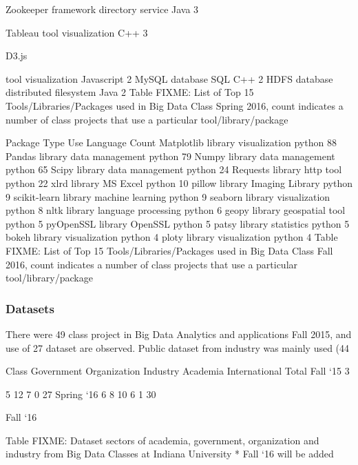 \documentclass[9pt,twocolumn,twoside]{styles/osajnl}
\begin{document}
	Zookeeper
	framework
	directory service
	Java
	3

	Tableau
	tool
	visualization
	C++
	3

	D3.js

	tool
	visualization
	Javascript
	2
	MySQL
	database
	SQL
	C++
	2
	HDFS
	database
	distributed filesystem
	Java
	2
	Table FIXME: List of Top 15 Tools/Libraries/Packages used in Big Data Class Spring 2016, count indicates a number of class projects that use a particular tool/library/package


Package
	Type
	Use
	Language
	Count
	Matplotlib
	library
	visualization
	python
	88
	Pandas
	library
	data management
	python
	79
	Numpy
	library
	data management
	python
	65
	Scipy
	library
	data management
	python
	24
	Requests
	library
	http tool
	python
	22
	xlrd
	library
	MS Excel
	python
	10
	pillow
	library
	Imaging Library
	python
	9
	scikit-learn
	library
	machine learning
	python
	9
	seaborn
	library
	visualization
	python
	8
	nltk
	library
	language processing
	python
	6
	geopy
	library
	geospatial tool
	python
	5
	pyOpenSSL
	library
	OpenSSL
	python
	5
	patsy
	library
	statistics
	python
	5
	bokeh
	library
	visualization
	python
	4
	ploty
	library
	visualization
	python
	4
	Table FIXME: List of Top 15 Tools/Libraries/Packages used in Big Data Class Fall 2016, count indicates a number of class projects that use a particular tool/library/package


\subsubsection{Datasets}

There were 49 class project in Big Data Analytics and applications Fall 2015, and use of 27 dataset are observed. Public dataset from industry was mainly used (44%


Class
	Government
	Organization
	Industry
	Academia
	International
	Total
	Fall ‘15
	3

	5
	12
	7
	0
	27
	Spring ‘16
	6
	8
	10
	6
	1
	30

	Fall ‘16
	

	

	

	

	

	

	Table FIXME: Dataset sectors of academia, government, organization and industry from Big Data Classes at Indiana University * Fall ‘16 will be added
\end{document}
